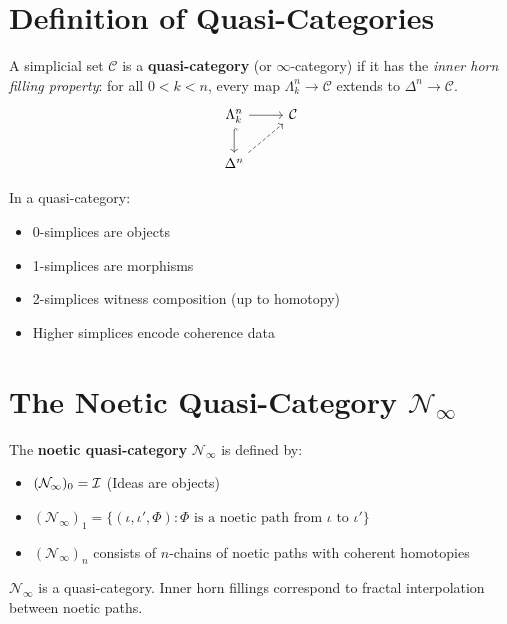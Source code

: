 \section{Definition of Quasi-Categories}

\begin{definition}
\label{def:quasi-category}
A simplicial set $\mathcal{C}$ is a \textbf{quasi-category} (or $\infty$-category)
if it has the \emph{inner horn filling property}: for all $0 < k < n$, every map
$\Lambda^n_k \to \mathcal{C}$ extends to $\Delta^n \to \mathcal{C}$.
\[
\begin{tikzcd}
\Lambda^n_k \arrow[r] \arrow[d, hook] & \mathcal{C} \\
\Delta^n \arrow[ur, dashed] &
\end{tikzcd}
\]
\end{definition}

\begin{remark}[Interpretation]
In a quasi-category:
\begin{itemize}
  \item 0-simplices are objects
  \item 1-simplices are morphisms
  \item 2-simplices witness composition (up to homotopy)
  \item Higher simplices encode coherence data
\end{itemize}
\end{remark}

\section{The Noetic Quasi-Category $\mathcal{N}_\infty$}

\begin{construction}
\label{constr:noetic-quasi-cat}
The \textbf{noetic quasi-category} $\mathcal{N}_\infty$ is defined by:
\begin{itemize}
  \item $(\mathcal{N}_\infty)_0 = \mathcal{I}$ (Ideas are objects)
  \item $(\mathcal{N}_\infty)_1 = \{(\iota, \iota', \Phi) : \Phi \text{ is a noetic path from } \iota \text{ to } \iota'\}$
  \item $(\mathcal{N}_\infty)_n$ consists of $n$-chains of noetic paths with coherent homotopies
\end{itemize}
\end{construction}

\begin{theorem}
\label{thm:noetic-qcat-well-defined}
$\mathcal{N}_\infty$ is a quasi-category. Inner horn fillings correspond to
fractal interpolation between noetic paths.
\end{theorem}

